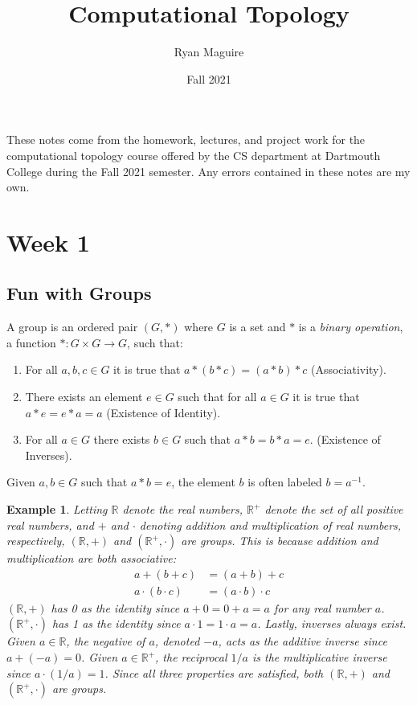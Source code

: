 \documentclass{article}
\title{Computational Topology}
\author{Ryan Maguire}
\date{Fall 2021}
\theoremstyle{plain}
\theoremstyle{normal}
\newtheorem{example}{Example}[section]
\begin{document}
    \maketitle
    These notes come from the homework, lectures, and project work for
    the computational topology course offered by the CS department at
    Dartmouth College during the Fall 2021 semester. Any errors contained
    in these notes are my own.
    \tableofcontents
    \section{Week 1}
        \subsection{Fun with Groups}
            A group is an ordered pair $(G,*)$ where $G$ is a set and $*$ is a
            \textit{binary operation}, a function $*:G\times{G}\rightarrow{G}$,
            such that:
            \begin{enumerate}
                \item For all $a,b,c\in{G}$ it is true that $a*(b*c)=(a*b)*c$
                      (Associativity).
                \item There exists an element $e\in{G}$ such that for all
                      $a\in{G}$ it is true that $a*e=e*a=a$
                      (Existence of Identity).
                \item For all $a\in{G}$ there exists $b\in{G}$ such that
                      $a*b=b*a=e$. (Existence of Inverses).
            \end{enumerate}
            Given $a,b\in{G}$ such that $a*b=e$, the element $b$ is often
            labeled $b=a^{-1}$.
            \begin{example}
                Letting $\mathbb{R}$ denote the real numbers,
                $\mathbb{R}^{+}$ denote the set of all positive real numbers,
                and $+$ and $\cdot$ denoting addition and multiplication of
                real numbers, respectively, $(\mathbb{R},+)$ and
                $(\mathbb{R}^{+},\cdot)$ are groups. This is because addition
                and multiplication are both associative:
                \begin{align}
                    a+(b+c)&=(a+b)+c\\
                    a\cdot(b\cdot{c})&=(a\cdot{b})\cdot{c}
                \end{align}
                $(\mathbb{R},+)$ has 0 as the identity since $a+0=0+a=a$ for
                any real number $a$. $(\mathbb{R}^{+},\cdot)$ has 1 as the
                identity since $a\cdot{1}=1\cdot{a}=a$. Lastly, inverses always
                exist. Given $a\in\mathbb{R}$, the negative of $a$, denoted
                $-a$, acts as the additive inverse since $a+(-a)=0$. Given
                $a\in\mathbb{R}^{+}$, the reciprocal $1/a$ is the
                multiplicative inverse since $a\cdot(1/a)=1$. Since all three
                properties are satisfied, both $(\mathbb{R},+)$ and
                $(\mathbb{R}^{+},\cdot)$ are groups.
            \end{example}
\end{document}
